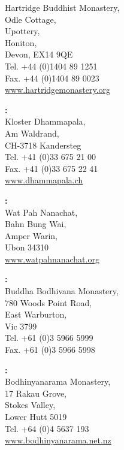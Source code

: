 {\begin{minipage}{0.8\linewidth}
\begin{multicols}{2}
{Hartridge Buddhist Monastery,\\
Odle Cottage,\\
Upottery,\\
Honiton,\\
Devon, EX14 9QE\\
Tel. +44 (0)1404 89 1251\\
Fax. +44 (0)1404 89 0023\\
\href{http://www.hartridgemonastery.org}{www.hartridgemonastery.org}

\vfill

\textbf{\MakeUppercase{\textSwitzerland}:} \\
Kloster Dhammapala,\\
Am Waldrand,\\
CH-3718 Kandersteg\\
Tel. +41 (0)33 675 21 00\\
Fax. +41 (0)33 675 22 41\\
\href{http://www.dhammapala.ch}{www.dhammapala.ch}

}

\columnbreak

{\raggedright

\textbf{\MakeUppercase{\textThailand}:} \\
Wat Pah Nanachat,\\
Bahn Bung Wai,\\
Amper Warin,\\
Ubon 34310\\
\href{http://www.watpahnanachat.org}{www.watpahnanachat.org}

\vfill

\textbf{\MakeUppercase{\textAustralia}:} \\
Buddha Bodhivana Monastery,\\
780 Woods Point Road,\\
East Warburton,\\
Vic 3799\\
Tel. +61 (0)3 5966 5999\\
Fax. +61 (0)3 5966 5998

\vfill

\textbf{\MakeUppercase{\textNewZealand}:} \\
Bodhinyanarama Monastery,\\
17 Rakau Grove,\\
Stokes Valley,\\
Lower Hutt 5019\\
Tel. +64 (0)4 5637 193\\
\href{http://www.bodhinyanarama.net.nz}{www.bodhinyanarama.net.nz}

}
\end{multicols}
\end{minipage}}
